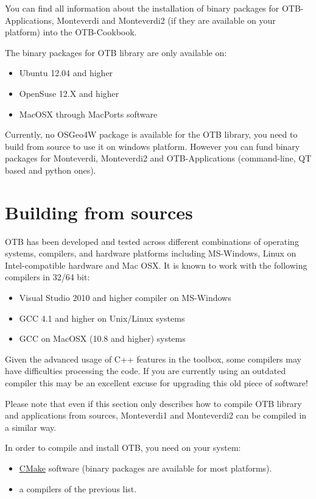 You can find all information about the installation of binary packages for OTB-Applications, Monteverdi and Monteverdi2 (if they are available on your platform) into the OTB-Cookbook.

The binary packages for OTB library are only available on:
\begin{itemize}
\item Ubuntu 12.04 and higher
\item OpenSuse 12.X and higher
\item MacOSX through MacPorts software  
\end{itemize}

Currently, no OSGeo4W package is available for the OTB library, you need to build from source to use it on windows platform. However you can fund binary packages for Monteverdi, Monteverdi2 and OTB-Applications (command-line, QT based and python ones).


\section{Building from sources}
\label{sec:source}
OTB has been developed and tested across different combinations of operating systems, compilers, and hardware platforms including MS-Windows, Linux on Intel-compatible hardware and Mac OSX.  It is known to work with the following compilers in 32/64 bit:
\begin{itemize}
\item Visual Studio 2010 and higher compiler on MS-Windows
\item GCC 4.1 and higher on Unix/Linux systems
\item GCC on MacOSX (10.8 and higher) systems
\end{itemize}

Given the advanced usage of C++ features in the toolbox, some compilers may have difficulties processing the code. If you are currently using an outdated compiler this may be an excellent excuse for upgrading this old piece of software!

Please note that even if this section only describes how to compile OTB library and applications from sources, Monteverdi1 and Monteverdi2 can be compiled in a similar way.

In order to compile and install OTB, you need on your system:
\begin{itemize}
  \item \href{http://www.cmake.org/}{CMake} software (binary packages are available for most platforms).
  \item a compilers of the previous list.
 \end{itemize}

